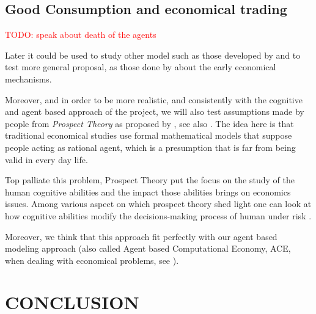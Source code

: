 \documentclass{wscpaperproc}
\newcommand{\memo}[2]{\textcolor{#1}{#2}}
\newcommand{\todo}[1]{\memo{red}{TODO: #1\\}}
\begin{document}
\subsection{Good Consumption and economical trading}

\todo{speak about death of the agents}

Later it could be used to study other model such as those developed by 
\cite{rubinstein_equilibrium_1985} and to test more general proposal, as those done by \cite{polanyi_trade_1957,polanyi_livelihood_1977} about the early economical mechanisms.

Moreover, and in order to be more realistic, and consistently with the cognitive and agent based approach of the project, we will also test assumptions made by people from \emph{Prospect Theory} as proposed by 
\cite{kahneman_prospect_1979}, see also
\cite{camerer_prospect_2004}. The idea here is that traditional economical studies use formal mathematical models that suppose people acting as rational agent, which is a presumption that is far from being valid  in every day life. 

Top palliate this problem, Prospect Theory put the focus on the study of the human cognitive abilities and the impact those abilities brings on economics issues. Among various aspect on which prospect theory shed light one can look at how cognitive abilities modify the decisions-making process of human under risk
\cite{weber_disposition_1998}.

Moreover, we think that this approach fit perfectly with our agent based modeling approach (also called Agent based Computational Economy, ACE, when dealing with economical problems, see
\cite{tesfatsion_introduction_2001}).


\section{CONCLUSION}





  
\end{document}
